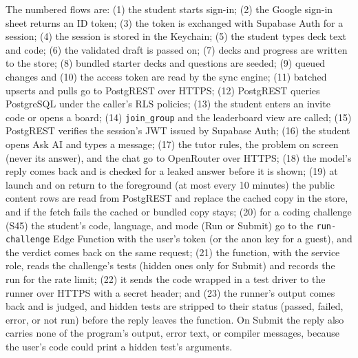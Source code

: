 \documentclass[12pt,letterpaper]{article}
\begin{document}
The numbered flows are: (1) the student starts sign-in; (2) the Google sign-in sheet
returns an ID token; (3) the token is exchanged with Supabase Auth for a session; (4)
the session is stored in the Keychain; (5) the student types deck text and code; (6)
the validated draft is passed on; (7) decks and progress are written to the store; (8)
bundled starter decks and questions are seeded; (9) queued changes and (10) the access
token are read by the sync engine; (11) batched upserts and pulls go to PostgREST over
HTTPS; (12) PostgREST queries PostgreSQL under the caller's RLS policies; (13) the
student enters an invite code or opens a board; (14) \texttt{join\_group} and the
leaderboard view are called; (15) PostgREST verifies the session's JWT issued by
Supabase Auth; (16) the student opens Ask AI and types a message; (17) the tutor rules,
the problem on screen (never its answer), and the chat go to OpenRouter over HTTPS;
(18) the model's reply comes back and is checked for a leaked answer before it is
shown; (19) at launch and on return to the foreground (at most every 10 minutes) the
public content rows are read from PostgREST and replace the cached copy in the store,
and if the fetch fails the cached or bundled copy stays; (20) for a coding challenge
(S45) the student's code, language, and mode (Run or Submit) go to the
\texttt{run-challenge} Edge Function with the user's token (or the anon key for a
guest), and the verdict comes back on the same request; (21) the function, with the
service role, reads the challenge's tests (hidden ones only for Submit) and records
the run for the rate limit; (22) it sends the code wrapped in a test driver to the
runner over HTTPS with a secret header; and (23) the runner's output comes back and is
judged, and hidden tests are stripped to their status (passed, failed, error, or not run) before the reply leaves the
function. On Submit the reply also carries none of the program's output, error text, or
compiler messages, because the user's code could print a hidden test's arguments.
\end{document}
